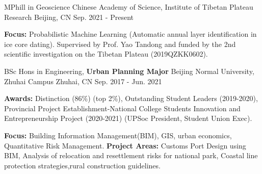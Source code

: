 

\begin{cventries}

  \cventry
    {MPhill in Geoscience} %
    {Chinese Academy of Science, Institute of Tibetan Plateau Research} %
    {Beijing, CN} %
    {Sep. 2021 - Present} %
    {
      \begin{cvitems} %
        \item {\textbf{Focus:} Probabilistic Machine Learning (Automatic annual layer identification in ice core dating). Supervised by Prof. Yao Tandong and funded by the 2nd scientific investigation on the Tibetan Plateau (2019QZKK0602).}
      \end{cvitems}
    }


  \cventry
    {BSc Hons in Engineering, \textbf{Urban Planning Major}} %
    {Beijing Normal University, Zhuhai Campus} %
    {Zhuhai, CN} %
    {Sep. 2017 - Jun. 2021} %
    {
      \begin{cvitems} %
        \item {\textbf{Awards:} Distinction (86\%) (top 2\%), Outstanding Student Leaders (2019-2020), Provincial Project Establishment-National College Students Innovation and Entrepreneurship Project (2020-2021) (UPSoc President, Student Union Exec). }
        \item {\textbf{Focus:} Building Information Management(BIM), GIS, urban economics, Quantitative Risk Management. \textbf{Project Areas:} Customs Port Design using BIM, Analysis of relocation and resettlement risks for national park, Coastal line protection strategies,rural construction guidelines. }
      \end{cvitems}
    }

  \vspace{-5mm}

\end{cventries}
